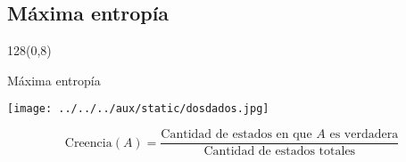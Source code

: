\documentclass[shownotes]{beamer}
\begin{document}
\begin{frame}
 
 



\end{frame}

 \subsection{M\'axima entrop\'ia}
  \begin{frame}
 \begin{textblock}{128}(0,8)
 \begin{center}
 \large M\'axima entrop\'ia 
 \end{center}
 \end{textblock}
\vspace{-1cm}
 
 \begin{center}
\texttt{[image: ../../../aux/static/dosdados.jpg]}
 \end{center}
 
  \pause
 
 \vspace{0.5cm}
 
 \begin{equation*}
  \text{Creencia}(A) = \frac{\text{Cantidad de estados en que $A$ es verdadera}}{\text{Cantidad de estados totales}}
 \end{equation*}
 
 \end{frame}
\end{document}
